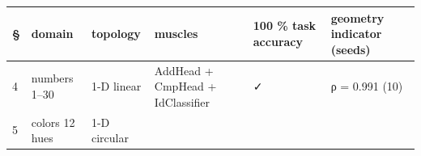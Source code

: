 \begin{longtable}[]{@{}llllll@{}}
\toprule
\begin{minipage}[b]{0.14\columnwidth}\raggedright
§\strut
\end{minipage} & \begin{minipage}[b]{0.14\columnwidth}\raggedright
domain\strut
\end{minipage} & \begin{minipage}[b]{0.14\columnwidth}\raggedright
topology\strut
\end{minipage} & \begin{minipage}[b]{0.14\columnwidth}\raggedright
muscles\strut
\end{minipage} & \begin{minipage}[b]{0.14\columnwidth}\raggedright
100 \% task accuracy\strut
\end{minipage} & \begin{minipage}[b]{0.14\columnwidth}\raggedright
geometry indicator (seeds)\strut
\end{minipage}\tabularnewline
\midrule
\endhead
\begin{minipage}[t]{0.14\columnwidth}\raggedright
4\strut
\end{minipage} & \begin{minipage}[t]{0.14\columnwidth}\raggedright
numbers 1--30\strut
\end{minipage} & \begin{minipage}[t]{0.14\columnwidth}\raggedright
1-D linear\strut
\end{minipage} & \begin{minipage}[t]{0.14\columnwidth}\raggedright
AddHead + CmpHead + IdClassifier\strut
\end{minipage} & \begin{minipage}[t]{0.14\columnwidth}\raggedright
✓\strut
\end{minipage} & \begin{minipage}[t]{0.14\columnwidth}\raggedright
ρ = 0.991 (10)\strut
\end{minipage}\tabularnewline
\begin{minipage}[t]{0.14\columnwidth}\raggedright
5\strut
\end{minipage} & \begin{minipage}[t]{0.14\columnwidth}\raggedright
colors 12 hues\strut
\end{minipage} & \begin{minipage}[t]{0.14\columnwidth}\raggedright
1-D circular\strut
\end{minipage} & \begin{minipage}[t]{0.14\columnwidth}\raggedright

\end{minipage}
\end{longtable}
